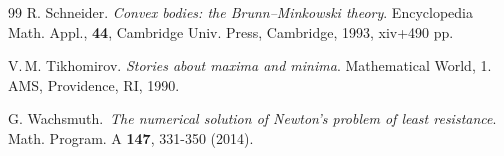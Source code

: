 \documentclass[a4paper,12pt]{article}
\theoremstyle{remark}
\theoremstyle{definition}
\begin{document}
\begin{thebibliography}{99}
 R. Schneider. {\it Convex bodies: the Brunn–Minkowski theory}. Encyclopedia Math. Appl., {\bf 44}, Cambridge Univ. Press, Cambridge, 1993, xiv+490 pp.

 V.\,M. Tikhomirov. {\it Stories about maxima and minima}. Mathematical World, 1. AMS, Providence, RI, 1990.

G. Wachsmuth.\, {\it The numerical solution of Newton’s problem of least resistance}.\, Math. Program. A {\bf 147}, 331-350 (2014).


\end{thebibliography}
\end{document}
